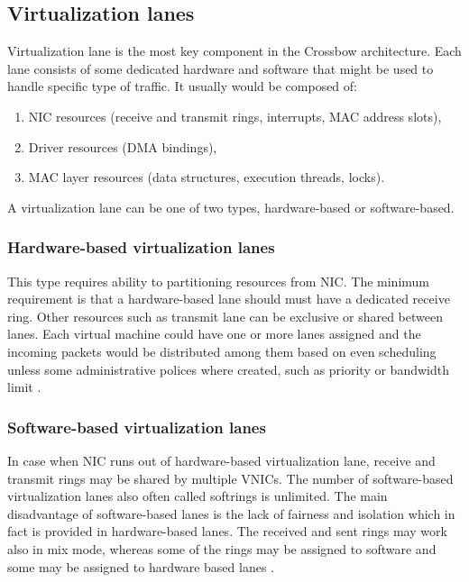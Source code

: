 \documentclass[11pt]{book}
\begin{document}
		
      \subsection{Virtualization lanes}

        Virtualization lane is the most key component in the Crossbow architecture. Each lane consists of some dedicated
        hardware and software that might be used to handle specific type of traffic. It usually would be composed of: 

        \begin{enumerate}
          \item NIC resources (receive and transmit rings, interrupts, MAC address slots),
          \item Driver resources (DMA bindings),
          \item MAC layer resources (data structures, execution threads, locks).
        \end{enumerate}
        
        A virtualization lane can be one of two types, hardware-based or software-based.

        
        \subsubsection{Hardware-based virtualization lanes}
        
          This type requires ability to partitioning resources from NIC. The minimum requirement is that a
          hardware-based lane should must have a dedicated receive ring.  Other resources such as transmit lane can be
          exclusive or shared between lanes. Each virtual machine could have one or more lanes assigned and the incoming
          packets would be distributed among them based on even scheduling unless some administrative polices where
          created, such as priority or bandwidth limit \cite{crossbow}.		

        
        \subsubsection{Software-based virtualization lanes}
        
          In case when NIC runs out of hardware-based virtualization lane, receive and transmit rings may be shared by
          multiple VNICs. The number of software-based virtualization lanes also often called softrings is unlimited.
          The main disadvantage of software-based lanes is the lack of fairness and isolation which in fact is provided
          in hardware-based lanes. The received and sent rings may work also in mix mode, whereas some of the rings may
          be assigned to software and some may be assigned to hardware based lanes \cite{crossbow}.	
			
\end{document}
